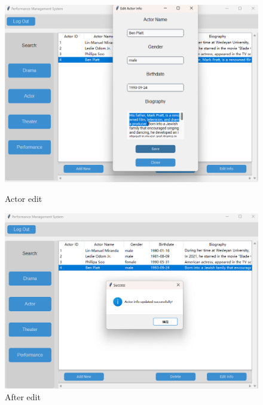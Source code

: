 \documentclass[12pt]{article}
\begin{document}
\begin{figure}[H]
    \centering
    \begin{minipage}{0.48\textwidth}
        \centering
        \includegraphics[width=\textwidth]{35.png}
        \caption{Actor edit} 
        \label{Figure 35}
    \end{minipage}
    \hfill
    \begin{minipage}{0.48\textwidth}
        \centering
        \includegraphics[width=\textwidth]{36.png}
        \caption{After edit}
        \label{Figure 36}
    \end{minipage}
\end{figure}
\end{document}
